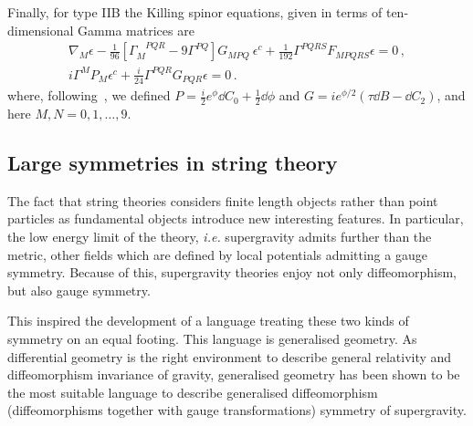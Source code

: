 \documentclass[debug]{phd}
\begin{document}
				Finally, for type IIB the Killing spinor equations, given in terms of ten-dimensional Gamma matrices are
						\begin{subequations}
							\begin{align}
								\nabla_M \epsilon - \frac{1}{96} \left[ \Gamma_M^{\phantom{M}PQR} - 9 \Gamma^{PQ} \right] G_{MPQ}\ \epsilon^c + \frac{1}{192}\Gamma^{PQRS}F_{MPQRS} \epsilon =0 \, , \\
								i \Gamma^M P_M \epsilon^c + \frac{i}{24} \Gamma^{PQR} G_{PQR} \epsilon = 0 \, .
							\end{align}
						\end{subequations}
				where, following~\cite{Gauntlett:2005ww}, we defined $P = \tfrac{i}{2}e^\phi \dd C_0 + \tfrac{1}{2}\dd \phi$ and $G = i e^{\phi/2}(\tau \dd B - \dd C_2)$, and here $M,N = 0,1, \dots, 9$.
				\subsection{Large symmetries in string theory}
					The fact that string theories considers finite length objects rather than point particles as fundamental objects introduce new interesting features.
					In particular, the low energy limit of the theory, \emph{i.e.} supergravity admits further than the metric, other fields which are defined by local potentials admitting a gauge symmetry.
					Because of this, supergravity theories enjoy not only diffeomorphism, but also gauge symmetry.
					
					This inspired the development of a language treating these two kinds of symmetry on an equal footing. 
					This language is generalised geometry.
					As differential geometry is the right environment to describe general relativity and diffeomorphism invariance of gravity, generalised geometry has been shown to be the most suitable language to describe generalised diffeomorphism (diffeomorphisms together with gauge transformations) symmetry of supergravity.
					
\end{document}
